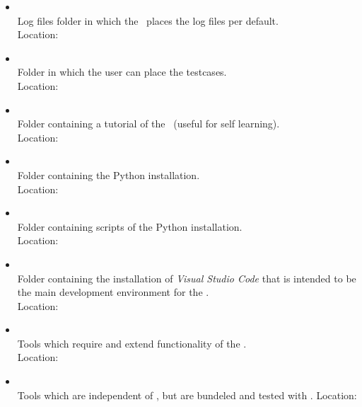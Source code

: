 \begin{itemize}
   \item {}\\
         Log files folder in which the \rfw\ places the log files per default.\\
         Location: 

   \item {}\\
         Folder in which the user can place the testcases.\\
         Location: 

   \item {}\\
         Folder containing a tutorial of the \rfw\ (useful for self learning).\\
         Location: 

   \item {}\\
         Folder containing the Python installation.\\
         Location: 

   \item {}\\
         Folder containing scripts of the Python installation.\\
         Location: 

   \item {}\\
         Folder containing the installation of \textit{Visual Studio Code} that is intended
         to be the main development environment for the \rfw.\\
         Location: 

   \item {}\\
         Tools which require and extend functionality of the \rfwcore.\\
         Location: 

   \item {}\\
         Tools which are independent of \rfwcore, but are bundeled and tested with \rfw.
         Location: 


\end{itemize}
